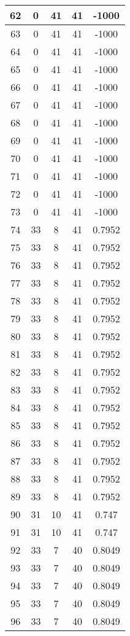 \documentclass[letterpaper, 12pt]{article}
\begin{document}
\begin{longtable}{|c|c|c|c|c|}
\hline
62 & 0 & 41 & 41 & -1000 \\
\hline
63 & 0 & 41 & 41 & -1000 \\
\hline
64 & 0 & 41 & 41 & -1000 \\
\hline
65 & 0 & 41 & 41 & -1000 \\
\hline
66 & 0 & 41 & 41 & -1000 \\
\hline
67 & 0 & 41 & 41 & -1000 \\
\hline
68 & 0 & 41 & 41 & -1000 \\
\hline
69 & 0 & 41 & 41 & -1000 \\
\hline
70 & 0 & 41 & 41 & -1000 \\
\hline
71 & 0 & 41 & 41 & -1000 \\
\hline
72 & 0 & 41 & 41 & -1000 \\
\hline
73 & 0 & 41 & 41 & -1000 \\
\hline
74 & 33 & 8 & 41 & 0.7952 \\
\hline
75 & 33 & 8 & 41 & 0.7952 \\
\hline
76 & 33 & 8 & 41 & 0.7952 \\
\hline
77 & 33 & 8 & 41 & 0.7952 \\
\hline
78 & 33 & 8 & 41 & 0.7952 \\
\hline
79 & 33 & 8 & 41 & 0.7952 \\
\hline
80 & 33 & 8 & 41 & 0.7952 \\
\hline
81 & 33 & 8 & 41 & 0.7952 \\
\hline
82 & 33 & 8 & 41 & 0.7952 \\
\hline
83 & 33 & 8 & 41 & 0.7952 \\
\hline
84 & 33 & 8 & 41 & 0.7952 \\
\hline
85 & 33 & 8 & 41 & 0.7952 \\
\hline
86 & 33 & 8 & 41 & 0.7952 \\
\hline
87 & 33 & 8 & 41 & 0.7952 \\
\hline
88 & 33 & 8 & 41 & 0.7952 \\
\hline
89 & 33 & 8 & 41 & 0.7952 \\
\hline
90 & 31 & 10 & 41 & 0.747 \\
\hline
91 & 31 & 10 & 41 & 0.747 \\
\hline
92 & 33 & 7 & 40 & 0.8049 \\
\hline
93 & 33 & 7 & 40 & 0.8049 \\
\hline
94 & 33 & 7 & 40 & 0.8049 \\
\hline
95 & 33 & 7 & 40 & 0.8049 \\
\hline
96 & 33 & 7 & 40 & 0.8049 \\

\end{longtable}
\end{document}
